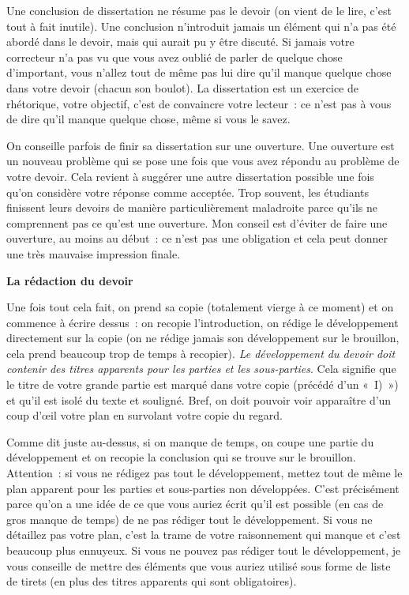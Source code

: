 \documentclass[
  letterpaper,
  DIV=11,
  numbers=noendperiod]{scrartcl}
\begin{document}
Une conclusion de dissertation ne résume pas le devoir (on vient de le
lire, c'est tout à fait inutile). Une conclusion n'introduit jamais un
élément qui n'a pas été abordé dans le devoir, mais qui aurait pu y être
discuté. Si jamais votre correcteur n'a pas vu que vous avez oublié de
parler de quelque chose d'important, vous n'allez tout de même pas lui
dire qu'il manque quelque chose dans votre devoir (chacun son boulot).
La dissertation est un exercice de rhétorique, votre objectif, c'est de
convaincre votre lecteur~: ce n'est pas à vous de dire qu'il manque
quelque chose, même si vous le savez.

On conseille parfois de finir sa dissertation sur une ouverture. Une
ouverture est un nouveau problème qui se pose une fois que vous avez
répondu au problème de votre devoir. Cela revient à suggérer une autre
dissertation possible une fois qu'on considère votre réponse comme
acceptée. Trop souvent, les étudiants finissent leurs devoirs de manière
particulièrement maladroite parce qu'ils ne comprennent pas ce qu'est
une ouverture. Mon conseil est d'éviter de faire une ouverture, au moins
au début~: ce n'est pas une obligation et cela peut donner une très
mauvaise impression finale.

\textbf{La rédaction du devoir}

Une fois tout cela fait, on prend sa copie (totalement vierge à ce
moment) et on commence à écrire dessus~: on recopie l'introduction, on
rédige le développement directement sur la copie (on ne rédige jamais
son développement sur le brouillon, cela prend beaucoup trop de temps à
recopier). \emph{Le développement du devoir doit contenir des titres
apparents pour les parties et les sous-parties}. Cela signifie que le
titre de votre grande partie est marqué dans votre copie (précédé d'un
«~I)~») et qu'il est isolé du texte et souligné. Bref, on doit pouvoir
voir apparaître d'un coup d'œil votre plan en survolant votre copie du
regard.

Comme dit juste au-dessus, si on manque de temps, on coupe une partie du
développement et on recopie la conclusion qui se trouve sur le
brouillon. Attention~: si vous ne rédigez pas tout le développement,
mettez tout de même le plan apparent pour les parties et sous-parties
non développées. C'est précisément parce qu'on a une idée de ce que vous
auriez écrit qu'il est possible (en cas de gros manque de temps) de ne
pas rédiger tout le développement. Si vous ne détaillez pas votre plan,
c'est la trame de votre raisonnement qui manque et c'est beaucoup plus
ennuyeux. Si vous ne pouvez pas rédiger tout le développement, je vous
conseille de mettre des éléments que vous auriez utilisé sous forme de
liste de tirets (en plus des titres apparents qui sont obligatoires).
\end{document}
